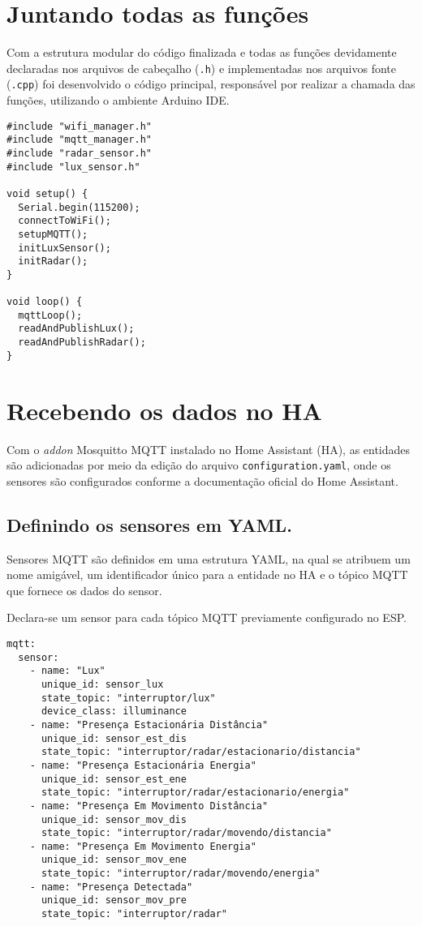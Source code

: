 \documentclass[]{abntex2}
\begin{document}
\section{Juntando todas as funções}
Com a estrutura modular do código finalizada e todas as funções devidamente
declaradas nos arquivos de cabeçalho (\texttt{.h}) e implementadas nos arquivos
fonte (\texttt{.cpp}) foi desenvolvido o código principal, responsável por
realizar a chamada das funções, utilizando o ambiente Arduino IDE.
\begin{verbatim}
#include "wifi_manager.h"
#include "mqtt_manager.h"
#include "radar_sensor.h"
#include "lux_sensor.h"

void setup() {
  Serial.begin(115200);
  connectToWiFi();
  setupMQTT();
  initLuxSensor();
  initRadar();
}

void loop() {
  mqttLoop();
  readAndPublishLux();
  readAndPublishRadar();
}
\end{verbatim}

\section{Recebendo os dados no HA}
Com o \textit{addon} Mosquitto MQTT instalado no Home Assistant (HA), as
entidades são adicionadas por meio da edição do arquivo
\texttt{configuration.yaml}, onde os sensores são configurados conforme a
documentação oficial do Home Assistant.

 \subsection{Definindo os sensores em YAML.}
Sensores MQTT são definidos em uma estrutura YAML, na qual se atribuem um nome
amigável, um identificador único para a entidade no HA e o tópico MQTT que
fornece os dados do sensor.

Declara-se um sensor para cada tópico MQTT previamente configurado no ESP.

\begin{verbatim}
mqtt:
  sensor:
    - name: "Lux"
      unique_id: sensor_lux
      state_topic: "interruptor/lux"
      device_class: illuminance
    - name: "Presença Estacionária Distância"
      unique_id: sensor_est_dis
      state_topic: "interruptor/radar/estacionario/distancia"
    - name: "Presença Estacionária Energia"
      unique_id: sensor_est_ene
      state_topic: "interruptor/radar/estacionario/energia"
    - name: "Presença Em Movimento Distância"
      unique_id: sensor_mov_dis
      state_topic: "interruptor/radar/movendo/distancia"
    - name: "Presença Em Movimento Energia"
      unique_id: sensor_mov_ene
      state_topic: "interruptor/radar/movendo/energia"
    - name: "Presença Detectada"
      unique_id: sensor_mov_pre
      state_topic: "interruptor/radar"
\end{verbatim}
\end{document}

